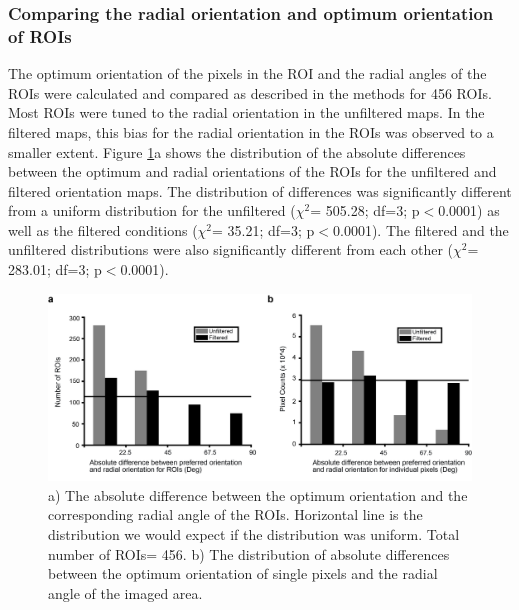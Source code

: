 		\subsubsection{Comparing the radial orientation and optimum orientation of ROIs}
		The optimum orientation of the pixels in the ROI and the radial angles of the ROIs were calculated and compared as described in the methods for 456 ROIs. Most ROIs were tuned to the radial orientation in the unfiltered maps. In the filtered maps, this bias for the radial orientation in the ROIs was observed to a smaller extent. Figure \ref{fig:roihist}a shows the distribution of the absolute differences between the optimum and radial orientations of the ROIs for the unfiltered and filtered orientation maps. The distribution of differences was significantly different from a uniform distribution for the unfiltered ($\chi^2$= 505.28; df=3; p$<$0.0001) as well as the filtered conditions ($\chi^2$= 35.21; df=3; p$<$0.0001). The filtered and the unfiltered distributions were also significantly different from each other ($\chi^2$= 283.01; df=3; p$<$0.0001).
			
			\begin{figure}[H]
				
				\includegraphics[width=\linewidth]{rb/FinalFigures/ROIhist.jpg}
				\caption{a) The absolute difference between the optimum orientation and the corresponding radial angle of the ROIs. Horizontal line is the distribution we would expect if the distribution was uniform. Total number of ROIs= 456. b) The distribution of absolute differences between the optimum orientation of single pixels and the radial angle of the imaged area.}
				\label{fig:roihist}
			\end{figure}
